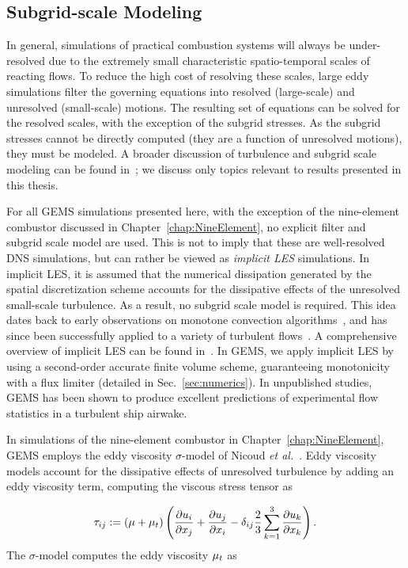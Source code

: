 \subsection{Subgrid-scale Modeling}

In general, simulations of practical combustion systems will always be under-resolved due to the extremely small characteristic spatio-temporal scales of reacting flows. To reduce the high cost of resolving these scales, large eddy simulations filter the governing equations into resolved (large-scale) and unresolved (small-scale) motions. The resulting set of equations can be solved for the resolved scales, with the exception of the subgrid stresses. As the subgrid stresses cannot be directly computed (they are a function of unresolved motions), they must be modeled. A broader discussion of turbulence and subgrid scale modeling can be found in~\cite{Pope2000}; we discuss only topics relevant to results presented in this thesis.

For all GEMS simulations presented here, with the exception of the nine-element combustor discussed in Chapter~\ref{chap:NineElement}, no explicit filter and subgrid scale model are used. This is not to imply that these are well-resolved DNS simulations, but can rather be viewed as \textit{implicit LES} simulations. In implicit LES, it is assumed that the numerical dissipation generated by the spatial discretization scheme accounts for the dissipative effects of the unresolved small-scale turbulence. As a result, no subgrid scale model is required. This idea dates back to early observations on monotone convection algorithms~\cite{Boris1989}, and has since been successfully applied to a variety of turbulent flows~\cite{Porter1994,Grinstein2005,Bensow2010}. A comprehensive overview of implicit LES can be found in~\cite{ilesBook}. In GEMS, we apply implicit LES by using a second-order accurate finite volume scheme, guaranteeing monotonicity with a flux limiter (detailed in Sec.~\ref{sec:numerics}). In unpublished studies, GEMS has been shown to produce excellent predictions of experimental flow statistics in a turbulent ship airwake.

In simulations of the nine-element combustor in Chapter~\ref{chap:NineElement}, GEMS employs the eddy viscosity $\sigma$-model of Nicoud \textit{et al.}~\cite{Nicoud2011}. Eddy viscosity models account for the dissipative effects of unresolved turbulence by adding an eddy viscosity term, computing the viscous stress tensor as

\begin{equation}
	\tau_{i j} := \left(\mu + \mu_{t}\right) \left( \frac{\partial u_{i}}{\partial x_{j}} + \frac{\partial u_{j}}{\partial x_{i}} - \delta_{i j} \frac{2}{3} \sum_{k=1}^3 \frac{\partial u_{k}}{\partial x_{k}} \right).
\end{equation}
The $\sigma$-model computes the eddy viscosity $\mu_{t}$ as

